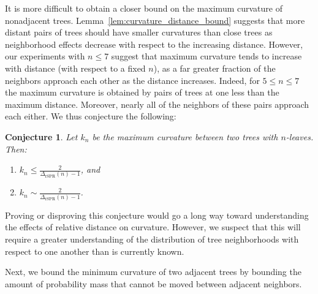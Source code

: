 \documentclass[]{elsarticle}
\newtheorem{conj}[thm]{Conjecture}
\begin{document}
It is more difficult to obtain a closer bound on the maximum curvature of nonadjacent trees.
Lemma~\ref{lem:curvature_distance_bound} suggests that more distant pairs of trees should have smaller curvatures than close trees as neighborhood effects decrease with respect to the increasing distance.
However, our experiments with $n \le 7$ suggest that maximum curvature tends to increase with distance (with respect to a fixed $n$), as a far greater fraction of the neighbors approach each other as the distance increases.
Indeed, for $5 \le n \le 7$ the maximum curvature is obtained by pairs of trees at one less than the maximum distance.
Moreover, nearly all of the neighbors of these pairs approach each either.
We thus conjecture the following:
\begin{conj}
	Let $k_n$ be the maximum curvature between two trees with $n$-leaves.
	Then:
	\begin{enumerate}
		\item $k_n \le \frac{2}{\Delta_{\text{rSPR}}(n)-1}$, and
		\item $ k_n \sim \frac{2}{\Delta_{\text{rSPR}}(n)-1}$.
	\end{enumerate}
\end{conj}
Proving or disproving this conjecture would go a long way toward understanding the effects of relative distance on curvature.
However, we suspect that this will require a greater understanding of the distribution of tree neighborhoods with respect to one another than is currently known.

Next, we bound the minimum curvature of two adjacent trees by bounding the amount of probability mass that cannot be moved between adjacent neighbors.
\end{document}
